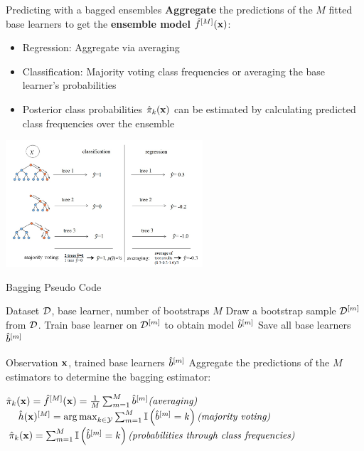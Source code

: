 \documentclass[11pt,compress,t,notes=noshow, xcolor=table]{beamer}
\begin{document}
\begin{vbframe}{Predicting with a bagged ensembles}
\textbf{Aggregate} the predictions of the $M$ fitted base learners to get the
\textbf{ensemble model} $\hat f^{[M]}(\mathbf{x})$:
  \begin{itemize}
    \item Regression: Aggregate via averaging
    \item Classification: Majority voting class frequencies or averaging the base learner's probabilities
    \item Posterior class probabilities $\hat \pi_{k}(\mathbf{x})$ can be estimated by calculating predicted class frequencies over the ensemble
  \end{itemize}

\begin{center}
\includegraphics[width=0.55\textwidth]{figure_man/rf_majvot_averaging.png}
\end{center}
\end{vbframe}


\begin{vbframe}{Bagging Pseudo Code}

\begin{algorithm}[H]
  \footnotesize
  \caption*{Bagging algorithm: Training}
  \begin{algorithmic}[1]
     Dataset $\mathcal{D}$, base learner, number of bootstraps $M$
      \State Draw a bootstrap sample $\mathcal{D}^{[m]}$ from $\mathcal{D}$.
      \State Train base learner on $\mathcal{D}^{[m]}$ to obtain model $\hat{b}^{[m]}$
    \EndFor
    \State Save all base learners $\hat{b}^{[m]}$
  \end{algorithmic}
\end{algorithm}

\begin{algorithm}[H]
  \footnotesize
  \caption*{Bagging algorithm: Prediction for classification}
  \begin{algorithmic}[1]
     Observation $\mathbf{x}$, trained base learners $\hat{b}^{[m]}$
    \State Aggregate the predictions of the $M$ estimators to determine the bagging estimator:
    \begin{center}
    $ \hat \pi_{k}(\mathbf{x})= \hat f^{[M]}(\mathbf{x}) = \frac{1}{M} \sum_{m=1}^M \hat{b}^{[m]} \textit{(averaging)}$
    $\quad \hat{h}(\mathbf{x})^{[M]} = \operatorname*{arg\,max}_{k \in \mathcal{Y}} \sum_{m=1}^M \mathbb{I}\left(\hat{b}^{[m]} = k\right) \textit{(majority voting)}$
    $\hat \pi_{k}(\mathbf{x})= \sum_{m=1}^M \mathbb{I}\left(\hat{b}^{[m]} = k\right) \textit{(probabilities through class frequencies)}$
    \end{center}
  \end{algorithmic}
\end{algorithm}

\end{vbframe}
\end{document}
